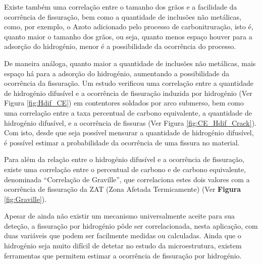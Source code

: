 \newpage
\par
Existe também uma correlação entre o tamanho dos grãos e a facilidade da ocorrência de fissuração\cite{Seo2008}, bem como a quantidade de inclusões não metálicas, como, por exemplo, o Azoto adicionado pelo processo de carbonitruração, isto é, quanto maior o tamanho dos grãos, ou seja, quanto menos espaço houver para a adsorção do hidrogénio, menor é a possibilidade da ocorrência do processo.
\par
De maneira análoga, quanto maior a quantidade de inclusões não metálicas, mais espaço há para a adsorção do hidrogénio, aumentando a possibilidade da ocorrência da fissuração. Um estudo verificou uma correlação entre a quantidade de hidrogénio difusível e a ocorrência de fissuração induzida por hidrogénio\cite{Santos2021} (Ver Figura \ref{fig:Hdif_CE}) em contentores soldados por arco submerso, bem como uma correlação entre a taxa percentual de carbono equivalente, a quantidade de hidrogénio difusível, e a ocorrência de fissuras (Ver Figura \ref{fig:CE_Hdif_Crack}). Com isto, desde que seja possível mensurar a quantidade de hidrogénio difusível, é possível estimar a probabilidade da ocorrência de uma fissura no material.
\par
Para além da relação entre o hidrogénio difusível e a ocorrência de fissuração, existe uma correlação entre o percentual de carbono e de carbono equivalente, denominada “Correlação de Graville”, que correlaciona estes dois valores com a ocorrência de fissuração da ZAT (Zona Afetada Termicamente) (Ver \textbf{Figura} \ref{fig:Graville})\cite{Olson2007}.

\par
Apesar de ainda não existir um mecanismo universalmente aceite para sua deteção, a fissuração por hidrogénio pôde ser correlacionada, nesta aplicação, com duas variáveis que podem ser facilmente medidas ou calculadas. Ainda que o hidrogénio seja muito difícil de detetar no estudo da microestrutura, existem ferramentas que permitem estimar a ocorrência de fissuração por hidrogénio.
